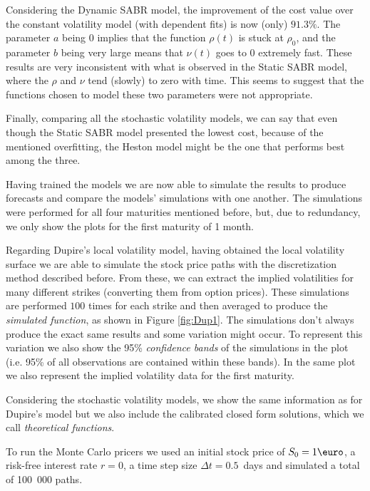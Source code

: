 Considering the Dynamic SABR model, the improvement of the cost value over the constant volatility model (with dependent fits) is now (only) $91.3\%$.
The parameter $a$ being $0$ implies that the function $\rho(t)$ is stuck at $\rho_0$, and the parameter $b$ being very large means that $\nu(t)$ goes to $0$ extremely fast. These results are very inconsistent with what is observed in the Static SABR model, where the $\rho$ and $\nu$ tend (slowly) to zero with time. This seems to suggest that the functions chosen to model these two parameters were not appropriate.


Finally, comparing all the stochastic volatility models, we can say that even though the Static SABR model presented the lowest cost, because of the mentioned overfitting, the Heston model might be the one that performs best among the three.
 
 
 
 
 
Having trained the models we are now able to simulate the results to produce forecasts and compare the models' simulations with one another.
The simulations were performed for all four maturities mentioned before, but, due to redundancy, we only show the plots for the first maturity of 1 month.

Regarding Dupire's local volatility model, having obtained the local volatility surface we are able to simulate the stock price paths with the discretization method described before. From these, we can extract the implied volatilities for many different strikes (converting them from option prices). These simulations are performed $100$ times for each strike and then averaged to produce the \emph{simulated function}, as shown in Figure \ref{fig:Dup1}. The simulations don't always produce the exact same results and some variation might occur. To represent this variation we also show the 95\% \emph{confidence bands} of the simulations in the plot (i.e. 95\% of all observations are contained within these bands). In the same plot we also represent the implied volatility data for the first maturity.

Considering the stochastic volatility models, we show the same information as for Dupire's model but we also include the calibrated closed form solutions, which we call \emph{theoretical functions}.


To run the Monte Carlo pricers we used an initial stock price of $S_0=1\text{\euro}$, a risk-free interest rate $r=0$, a time step size $\Delta t=0.5$\ days and simulated a total of 100\ 000 paths.

